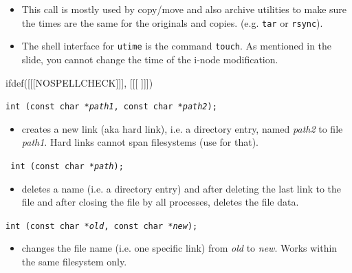 \begin{itemize}
\item This call is mostly used by copy/move and also archive utilities to make
sure the times are the same for the originals and copies.  (e.g. \texttt{tar} or
\texttt{rsync}). 
\item The shell interface for \texttt{utime} is the command \texttt{touch}.  As
mentioned in the slide, you cannot change the time of the i-node modification.
\end{itemize}


ifdef([[[NOSPELLCHECK]]], [[[
]]])

\begin{slide}
\texttt{int (const char *\emph{path1}, const char *\emph{path2});}
\begin{itemize}
\item creates a new link (aka hard link), i.e. a directory entry, named
\emph{path2} to file \emph{path1}.  Hard links cannot span filesystems (use
 for that).
\end{itemize}
\texttt{ int (const char *\emph{path});}
\begin{itemize}
\item deletes a name (i.e. a directory entry) and after deleting the last link to
the file and after closing the file by all processes, deletes the file data.
\end{itemize}
\texttt{int (const char *\emph{old}, const char *\emph{new});}
\begin{itemize}
\item changes the file name (i.e. one specific link) from \emph{old} to
\emph{new}.  Works within the same filesystem only.
\end{itemize}
\end{slide}

